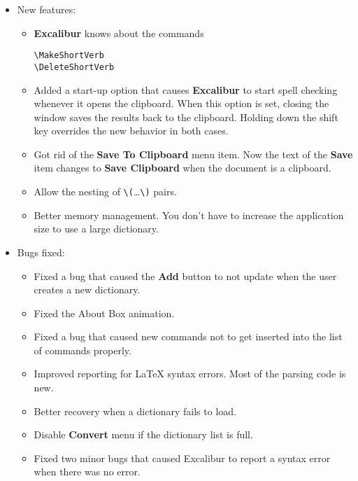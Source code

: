 \documentclass[11pt,titlepage]{article}
\newcommand{\ex}{\textbf{Excalibur}}
\begin{document}
\begin{itemize}

\item New features:

  \begin{itemize}

  \item \ex{} knows about the commands
\begin{verbatim}
\MakeShortVerb
\DeleteShortVerb
\end{verbatim}

  \item Added a start-up option that causes \ex{} to start spell
    checking whenever it opens the clipboard.  When this option is
    set, closing the window saves the results back to the clipboard.
    Holding down the shift key overrides the new behavior in both
    cases.

  \item Got rid of the \textbf{Save To Clipboard} menu item.  Now the
    text of the \textbf{Save} item changes to \textbf{Save Clipboard}
    when the document is a clipboard.

  \item Allow the nesting of \verb+\(+\ldots\verb+\)+ pairs.

  \item Better memory management.  You don't have to increase the
    application size to use a large dictionary.

  \end{itemize}

\item Bugs fixed:

  \begin{itemize}

  \item Fixed a bug that caused the \textbf{Add} button to not update
    when the user creates a new dictionary.

  \item Fixed the About Box animation.

  \item Fixed a bug that caused new commands not to get inserted into
    the list of commands properly.

  \item Improved reporting for \LaTeX{} syntax errors.  Most of the
    parsing code is new.

  \item Better recovery when a dictionary fails to load.

  \item Disable \textbf{Convert} menu if the dictionary list is full.

  \item Fixed two minor bugs that caused Excalibur to report a syntax
    error when there was no error.

  \end{itemize}

\end{itemize}
\end{document}
